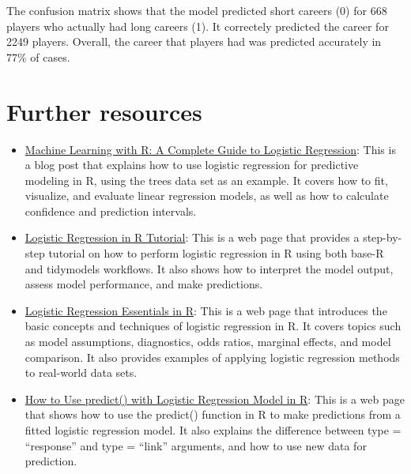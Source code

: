\documentclass[
]{book}
\providecommand{\tightlist}{%
  \setlength{\itemsep}{0pt}\setlength{\parskip}{0pt}}
\begin{document}
The confusion matrix shows that the model predicted short careers (0) for 668 players who actually had long careers (1). It correctely predicted the career for 2249 players. Overall, the career that players had was predicted accurately in 77\% of cases.

\hypertarget{further-resources-4}{%
\section{Further resources}\label{further-resources-4}}

\begin{itemize}
\tightlist
\item
  \href{https://www.r-bloggers.com/2021/01/machine-learning-with-r-a-complete-guide-to-logistic-regression/}{Machine Learning with R: A Complete Guide to Logistic Regression}: This is a blog post that explains how to use logistic regression for predictive modeling in R, using the trees data set as an example. It covers how to fit, visualize, and evaluate linear regression models, as well as how to calculate confidence and prediction intervals.
\item
  \href{https://www.datacamp.com/tutorial/logistic-regression-R}{Logistic Regression in R Tutorial}: This is a web page that provides a step-by-step tutorial on how to perform logistic regression in R using both base-R and tidymodels workflows. It also shows how to interpret the model output, assess model performance, and make predictions.
\item
  \href{http://sthda.com/english/articles/36-classification-methods-essentials/151-logistic-regression-essentials-in-r/}{Logistic Regression Essentials in R}: This is a web page that introduces the basic concepts and techniques of logistic regression in R. It covers topics such as model assumptions, diagnostics, odds ratios, marginal effects, and model comparison. It also provides examples of applying logistic regression methods to real-world data sets.
\item
  \href{https://www.statology.org/r-logistic-regression-predict/}{How to Use predict() with Logistic Regression Model in R}: This is a web page that shows how to use the predict() function in R to make predictions from a fitted logistic regression model. It also explains the difference between type = ``response'' and type = ``link'' arguments, and how to use new data for prediction.
\end{itemize}

  
\end{document}
